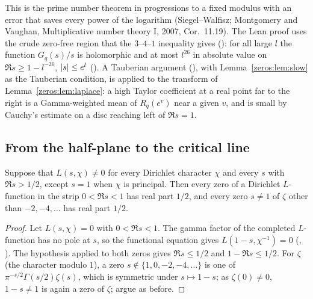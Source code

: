 This is the prime number theorem in progressions to a fixed modulus with an error that saves
every power of the logarithm (Siegel--Walfisz; Montgomery and Vaughan, Multiplicative number theory I, 2007, Cor.~11.19). The
Lean proof uses the crude zero-free region that the $3$--$4$--$1$ inequality gives (): for all large $l$
the function $G_q(s)/s$ is holomorphic and at most $l^{26}$ in absolute value on
$\Re s \ge 1 - l^{-26}$, $\lvert s\rvert \le e^l$ (). A
Tauberian argument (), with
Lemma~\ref{zeros:lem:slow} as the Tauberian condition, is applied to the transform of
Lemma~\ref{zeros:lem:laplace}: a high Taylor coefficient at a real point far to the right is a
Gamma-weighted mean of $R_q(e^v)$ near a given $v$, and is small by Cauchy's estimate on a disc
reaching left of $\Re s = 1$.

\subsection{From the half-plane to the critical line}

\begin{proposition}\label{zeros:prop:line}
Suppose that $L(s,\chi) \ne 0$ for every Dirichlet character $\chi$ and every $s$ with
$\Re s > 1/2$, except $s = 1$ when $\chi$ is principal. Then every zero of a Dirichlet
$L$-function in the strip $0 < \Re s < 1$ has real part $1/2$, and every zero $s \ne 1$ of $\zeta$
other than $-2, -4, \dots$ has real part $1/2$.
\end{proposition}

\begin{proof}
Let $L(s,\chi) = 0$ with $0 < \Re s < 1$. The gamma factor of the completed $L$-function has no
pole at $s$, so the functional equation gives $L(1-s,\chi^{-1}) = 0$
(, ). The hypothesis applied to both zeros gives
$\Re s \le 1/2$ and $1 - \Re s \le 1/2$. For $\zeta$ (the character modulo $1$), a zero $s \notin \{1, 0, -2, -4, \dots\}$ is one of $\pi^{-s/2}\Gamma(s/2)\zeta(s)$, which is
symmetric under $s \mapsto 1 - s$; as $\zeta(0) \ne 0$, $1 - s \ne 1$ is again a zero of $\zeta$; argue as before.
\end{proof}
